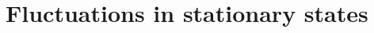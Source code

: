 \documentclass[compress,12pt]{beamer}
\begin{document}
\section{Fluctuations in stationary states}


\end{document}
